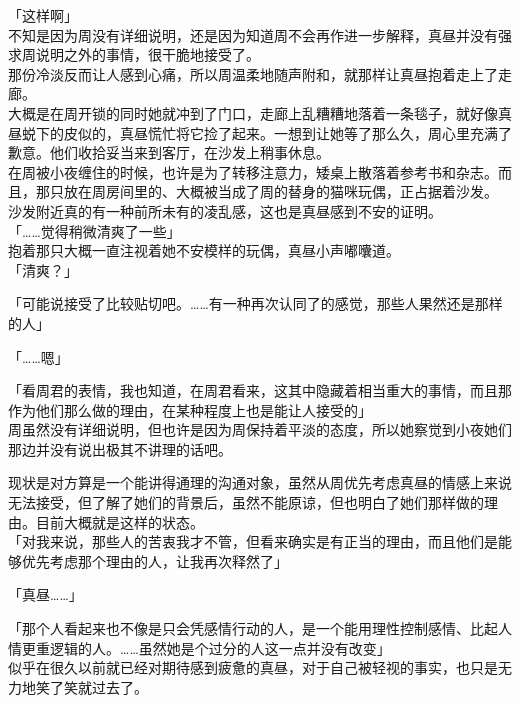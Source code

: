 「这样啊」\\

不知是因为周没有详细说明，还是因为知道周不会再作进一步解释，真昼并没有强求周说明之外的事情，很干脆地接受了。\\

那份冷淡反而让人感到心痛，所以周温柔地随声附和，就那样让真昼抱着走上了走廊。\\

大概是在周开锁的同时她就冲到了门口，走廊上乱糟糟地落着一条毯子，就好像真昼蜕下的皮似的，真昼慌忙将它捡了起来。一想到让她等了那么久，周心里充满了歉意。他们收拾妥当来到客厅，在沙发上稍事休息。\\

在周被小夜缠住的时候，也许是为了转移注意力，矮桌上散落着参考书和杂志。而且，那只放在周房间里的、大概被当成了周的替身的猫咪玩偶，正占据着沙发。\\

沙发附近真的有一种前所未有的凌乱感，这也是真昼感到不安的证明。\\

「……觉得稍微清爽了一些」\\

抱着那只大概一直注视着她不安模样的玩偶，真昼小声嘟囔道。\\

「清爽？」

「可能说接受了比较贴切吧。……有一种再次认同了的感觉，那些人果然还是那样的人」

「……嗯」

「看周君的表情，我也知道，在周君看来，这其中隐藏着相当重大的事情，而且那作为他们那么做的理由，在某种程度上也是能让人接受的」\\

周虽然没有详细说明，但也许是因为周保持着平淡的态度，所以她察觉到小夜她们那边并没有说出极其不讲理的话吧。

现状是对方算是一个能讲得通理的沟通对象，虽然从周优先考虑真昼的情感上来说无法接受，但了解了她们的背景后，虽然不能原谅，但也明白了她们那样做的理由。目前大概就是这样的状态。\\

「对我来说，那些人的苦衷我才不管，但看来确实是有正当的理由，而且他们是能够优先考虑那个理由的人，让我再次释然了」

「真昼……」

「那个人看起来也不像是只会凭感情行动的人，是一个能用理性控制感情、比起人情更重逻辑的人。……虽然她是个过分的人这一点并没有改变」\\

似乎在很久以前就已经对期待感到疲惫的真昼，对于自己被轻视的事实，也只是无力地笑了笑就过去了。\\

